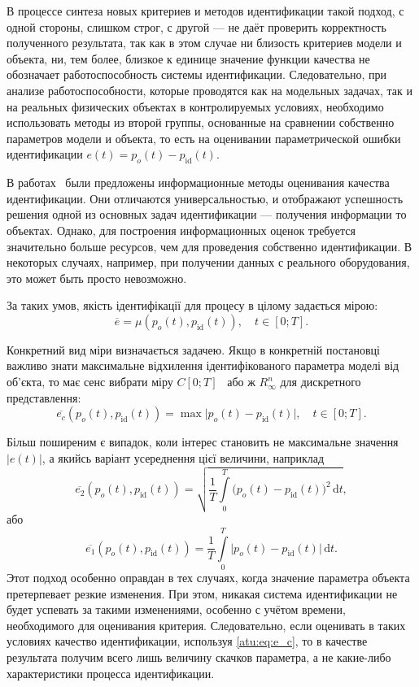 В процессе синтеза новых критериев и методов идентификации
такой подход, с одной стороны, слишком строг,
с другой --- не даёт проверить корректность полученного результата,
так как в этом случае ни близость критериев модели и объекта,
ни, тем более, близкое к единице значение функции качества не
обозначает работоспособность системы идентификации.
Следовательно, при анализе работоспособности,
которые проводятся как на модельных задачах,
так и на реальных физических объектах в контролируемых
условиях, необходимо использовать методы из второй группы,
основанные на сравнении собственно параметров модели и объекта,
то есть на оценивании параметрической
ошибки идентификации $e(t)=p_o(t)-p_\mathrm{id}(t)$.

В работах~\cite{info_cipkin,straton_inf,atu_phd_thesis,karabut} были предложены информационные методы
оценивания качества идентификации.
Они отличаются универсальностью, и отображают
успешность решения одной из основных задач
идентификации --- получения информации то объектах.
Однако, для построения информационных оценок
требуется значительно больше ресурсов, чем
для проведения собственно идентификации. В некоторых случаях,
например, при получении данных с реального оборудования,
это может быть просто невозможно.



За таких умов,
якість ідентифікації для процесу в цілому задається мірою:
%
\[
  \overline{e} = \mu( p_o(t), p_\mathrm{id}(t) ),
  \quad
  t \in [0;T].
\]

Конкретний вид міри визначається задачею. Якщо в конкретній постановці
важливо знати максимальне відхилення ідентифікованого параметра моделі від
об'єкта, то має сенс вибрати міру $C[0; T]$~\cite{kolmogorov_fun_ana} або ж $ R_{\infty}^n$ для
дискретного представлення:
%
\begin{equation}
  \overline{e_c}(p_o(t),p_\mathrm{id}(t))
  =
  \max \big| p_o(t)-p_\mathrm{id}(t) \big|,
  \quad
  t \in [0;T].
  \label{atu:eq:e_c}
\end{equation}

Більш поширеним є випадок, коли інтерес становить не максимальне значення
$|e(t)|$, а якийсь варіант усереднення цієї величини, наприклад
%
\begin{equation}
  \overline{e_2}(p_o(t),p_\mathrm{id}(t))
  =
  \sqrt{ \frac{1}{T} \int\limits_{0}^{T} \big( p_o(t)-p_\mathrm{id}(t) \big)^2 \, \mathrm{d}t },
  \label{atu:eq:e_2}
\end{equation}
%
або
\begin{equation}
  \overline{e_1}(p_o(t),p_\mathrm{id}(t))
  =
  \frac{1}{T} \int\limits_{0}^{T} \big| p_o(t)-p_\mathrm{id}(t) \big| \, \mathrm{d}t .
  \label{atu:eq:e_1}
\end{equation}
%
Этот подход особенно оправдан в тех случаях, когда
значение параметра объекта претерпевает резкие изменения.
При этом, никакая система идентификации не будет успевать за такими
изменениями, особенно с учётом времени, необходимого для
оценивания критерия. Следовательно, если оценивать в таких условиях
качество идентификации, используя \ref{atu:eq:e_c},
то в качестве результата получим всего лишь величину
скачков параметра, а не какие-либо характеристики процесса идентификации.

